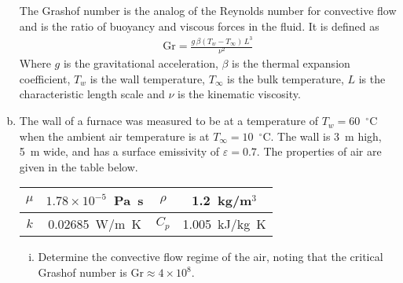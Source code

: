 \documentclass[calculator,datasheet,handbook]{exam}
\begin{document}
\begin{question}
\begin{enumerate}[a)]
{      The Grashof number is the analog of the Reynolds number for
      convective flow and is the ratio of buoyancy and viscous
      forces in the fluid. It is defined as
      \begin{align*}
        \text{Gr}=\frac{g\,\beta \left(T_w - T_\infty\right)\,L^3}{\nu^2}
      \end{align*}
      Where $g$ is the gravitational acceleration, $\beta$ is the
      thermal expansion coefficient, $T_w$ is the wall temperature,
      $T_\infty$ is the bulk temperature, $L$ is the characteristic
      length scale and $\nu$ is the kinematic viscosity.
    }
  \item The wall of a furnace was measured to be at a temperature of
    $T_w=60$~${}^\circ$C when the ambient air temperature is at
    $T_\infty=10$~${}^\circ$C. The wall is 3~m high, 5~m wide, and has
    a surface emissivity of $\varepsilon=0.7$. The properties of air
    are given in the table below.
    \begin{center}
      \begin{tabular}{|c|c||c|c|}\hline
        $\mu$ & $1.78\times10^{-5}$~Pa~s & 
        $\rho$ & 1.2~kg/m${}^3$\\\hline
        $k$ & 0.02685~W/m~K & $C_p$ & 1.005~kJ/kg~K\\\hline
      \end{tabular}
    \end{center}
    \begin{enumerate}[i)]
    \item Determine the convective flow regime of the air, noting that
      the critical Grashof number is $\text{Gr}\approx 4\times10^8$.%
\end{enumerate}
\end{enumerate}
\end{question}
\end{document}
